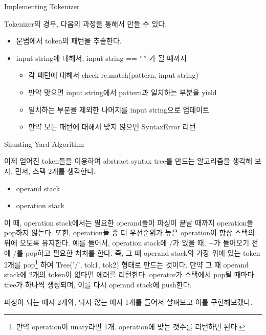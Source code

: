 \documentclass{beamer}
\begin{document}
\begin{frame}{Implementing Tokenizer} 

Tokenizer의 경우, 다음의 과정을 통해서 만들 수 있다. 

\begin{itemize} 
\item 문법에서 token의 패턴을 추출한다. 
\item input string에 대해서, input string == '''' 가 될 때까지 
\begin{itemize}
\item 각 패턴에 대해서 check re.match(pattern, input string)
\item 만약 맞으면 input string에서 pattern과 일치하는 부분을 yield
\item 일치하는 부분을 제외한 나머지를 input string으로 업데이트
\item 만약 모든 패턴에 대해서 맞지 않으면 SyntaxError 리턴
\end{itemize}
\end{itemize}
\end{frame}

\begin{frame}{Shunting-Yard Algorithm} 

이제 얻어진 token들을 이용하여 abstract syntax tree를 만드는 알고리즘을 생각해 보자. 먼저, 스택 2개를 생각한다. 

\begin{itemize} 
\item operand stack 
\item operation stack 
\end{itemize}

이 때, operation stack에서는 필요한 operand들이 파싱이 끝날 때까지 operation을 pop하지 않는다. 또한, operation들 중 더 우선순위가 높은 operation이 항상 스택의 위에 오도록 유지한다. 예를 들어서, operation stack에 /가 있을 때, +가 들어오기 전에 /를 pop하고 필요한 처치를 한다. 즉, 그 때 operand stack의 가장 위에 있는 token 2개를 pop\footnote{만약 operation이 unary라면 1개. operation에 맞는 갯수를 리턴하면 된다.}  하여 Tree('/', tok1, tok2) 형태로 만드는 것이다. 만약 그 때 operand stack에 2개의 token이 없다면 에러를 리턴한다. operator가 스택에서 pop될 때마다 tree가 하나씩 생성되며, 이를 다시 operand stack에 push한다.

파싱이 되는 예시 2개와, 되지 않는 예시 1개를 들어서 살펴보고 이를 구현해보겠다. 

\end{frame}
\end{document}

